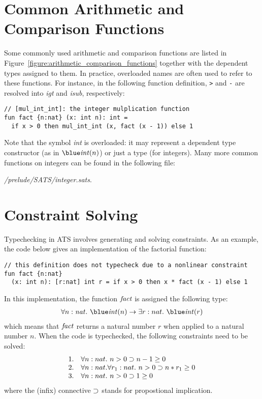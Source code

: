 \section{Common Arithmetic and Comparison Functions}
Some commonly used arithmetic and comparison functions are listed in
Figure~\ref{figure:arithmetic_comparison_functions} together with the
dependent types assigned to them. In practice, overloaded names are often
used to refer to these functions. For instance, in the following function
definition, {\it\verb`>`} and {\it \verb`-`} are resolved into {\it igt}
and {\it isub}, respectively:
\begin{verbatim}
// [mul_int_int]: the integer mulplication function
fun fact {n:nat} (x: int n): int =
  if x > 0 then mul_int_int (x, fact (x - 1)) else 1
\end{verbatim}
Note that the symbol {\it int} is overloaded: it may represent a dependent
type constructor (as in $\tint(n)$) or just a type (for integers).  Many
more common functions on integers can be found in the following file:
\begin{center}
{\it\ATSHOME/prelude/SATS/integer.sats}.
\end{center}

\section{Constraint Solving}
Typechecking in ATS involves generating and solving constraints.  As an
example, the code below gives an implementation of the factorial function:
\begin{verbatim}
// this definition does not typecheck due to a nonlinear constraint
fun fact {n:nat}
  (x: int n): [r:nat] int r = if x > 0 then x * fact (x - 1) else 1
\end{verbatim}
In this implementation, the function ${\it fact}$ is assigned the
following type:
\[\begin{array}{l}
\forall n:\snat.~\tint(n)\timp\exists r:nat.~\tint(r)
\end{array}\]
which means that ${\it fact}$ returns a natural number $r$ when applied to
a natural number $n$. When the code is typechecked, the following
constraints need to be solved:
\[\begin{array}{ll}
1. & \forall n:nat.~n > 0 \supset n - 1 \geq 0 \\
2. & \forall n:nat.\forall r_1:nat.~n > 0 \supset n * r_1 \geq 0 \\
3. & \forall n:nat.~n > 0 \supset 1 \geq 0 \\
\end{array}\]
where the (infix) connective $\supset$ stands for propostional
implication.

